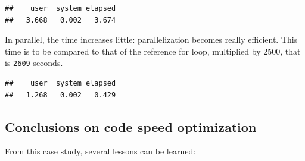 \documentclass[
  12pt,
  american,
  a4paper,
  extrafontsizes,onecolumn,openright
  ]{memoir}
\newenvironment{Shaded}{\begin{snugshade}}{\end{snugshade}}
\newcommand{\DecValTok}[1]{\textcolor[rgb]{0.00,0.00,0.81}{#1}}
\newcommand{\FunctionTok}[1]{\textcolor[rgb]{0.13,0.29,0.53}{\textbf{#1}}}
\newcommand{\NormalTok}[1]{#1}
\newcommand{\OtherTok}[1]{\textcolor[rgb]{0.56,0.35,0.01}{#1}}
\newcommand{\SpecialCharTok}[1]{\textcolor[rgb]{0.81,0.36,0.00}{\textbf{#1}}}
\begin{document}
\scriptsize

\begin{Shaded}
\end{Shaded}

\begin{verbatim}
##    user  system elapsed 
##   3.668   0.002   3.674
\end{verbatim}

\normalsize

In parallel, the time increases little: parallelization becomes really efficient.
This time is to be compared to that of the reference for loop, multiplied by 2500, that is \texttt{2609} seconds.

\scriptsize

\begin{Shaded}
\end{Shaded}

\begin{verbatim}
##    user  system elapsed 
##   1.268   0.002   0.429
\end{verbatim}

\normalsize

\subsection{Conclusions on code speed optimization}\label{conclusions-on-code-speed-optimization}

From this case study, several lessons can be learned:
\end{document}
